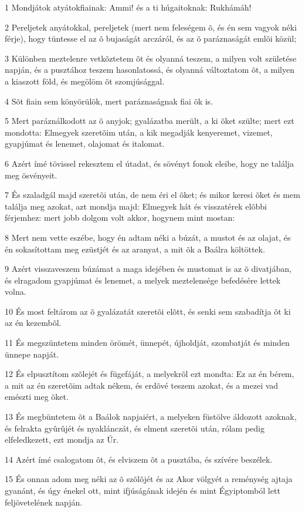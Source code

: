 \par 1 Mondjátok atyátokfiainak: Ammi! és a ti húgaitoknak: Rukhámáh!
\par 2 Pereljetek anyátokkal, pereljetek (mert nem feleségem õ, és én sem vagyok néki férje), hogy tüntesse el az õ bujaságát arczáról, és az õ paráznaságát emlõi közül;
\par 3 Különben meztelenre vetkõztetem õt és olyanná teszem, a milyen volt születése napján, és a pusztához teszem hasonlatossá, és olyanná változtatom õt, a milyen a kiaszott föld, és megölöm õt szomjúsággal.
\par 4 Sõt fiain sem könyörülök, mert paráznaságnak fiai õk is.
\par 5 Mert paráználkodott az õ anyjok; gyalázatba merült, a ki õket szülte; mert ezt mondotta: Elmegyek szeretõim után, a kik megadják kenyeremet, vizemet, gyapjúmat és lenemet, olajomat és italomat.
\par 6 Azért ímé tövissel rekesztem el útadat, és sövényt fonok eleibe, hogy ne találja meg ösvényeit.
\par 7 És szaladgál majd szeretõi után, de nem éri el õket; és mikor keresi õket és mem találja meg azokat, azt mondja majd: Elmegyek hát és visszatérek elõbbi férjemhez: mert jobb dolgom volt akkor, hogynem mint mostan:
\par 8 Mert nem vette eszébe, hogy én adtam néki a búzát, a mustot és az olajat, és én sokasítottam meg ezüstjét és az aranyat, a mit õk a Baálra költöttek.
\par 9 Azért visszaveszem búzámat a maga idejében és mustomat is az õ divatjában, és elragadom gyapjúmat és lenemet, a melyek meztelensége befedésére lettek volna.
\par 10 És most feltárom az õ gyalázatát szeretõi elõtt, és senki sem szabadítja õt ki az én kezembõl.
\par 11 És megszüntetem minden örömét, ünnepét, újholdját, szombatját és minden ünnepe napját.
\par 12 És elpusztítom szõlejét és fügefáját, a melyekrõl ezt mondta: Ez az én bérem, a mit az én szeretõim adtak nékem, és erdõvé teszem azokat, és a mezei vad emészti meg õket.
\par 13 És megbüntetem õt a Baálok napjaiért, a melyeken füstölve áldozott azoknak, és felrakta gyûrûjét és nyaklánczát, és elment szeretõi után, rólam pedig elfeledkezett, ezt mondja az Úr.
\par 14 Azért ímé csalogatom õt, és elviszem õt a pusztába, és szívére beszélek.
\par 15 És onnan adom meg néki az õ szõlõjét és az Akor völgyét a reménység ajtaja gyanánt, és úgy énekel ott,  mint ifjúságának idején és mint Égyiptomból lett feljövetelének napján.
